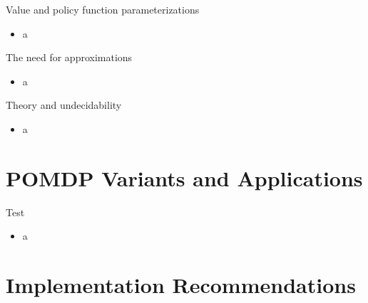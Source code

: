 \documentclass[presentation, smaller]{beamer}
\begin{document}
\begin{frame}[label={sec:orgace4593}]{Value and policy function parameterizations}
\begin{itemize}
\item a
\end{itemize}
\end{frame}

\begin{frame}[label={sec:org6e7b2c9}]{The need for approximations}
\begin{itemize}
\item a
\end{itemize}
\end{frame}

\begin{frame}[label={sec:orgdab8c83}]{Theory and undecidability}
\begin{itemize}
\item a
\end{itemize}
\end{frame}

\section{POMDP Variants and Applications}
\label{sec:orgd471382}

\begin{frame}[label={sec:org398f9e8}]{Test}
\begin{itemize}
\item a
\end{itemize}
\end{frame}

\section{Implementation Recommendations}
\label{sec:org86ca638}
\end{document}
